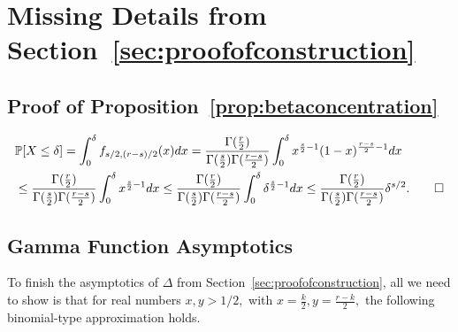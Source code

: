 \documentclass[preprint]{article}
\newcommand{\prob}{\mathbb{P}}
\newcommand{\expect}{\mathbb{E}}
\begin{document}



\section{Missing Details from \texorpdfstring{Section~\ref{sec:proofofconstruction}}{Proof of Construction}}
\label{appendix:MissingDetalsProofOfConstruction}
\subsection{Proof of Proposition~\texorpdfstring{\ref{prop:betaconcentration}}{Beta Concentration}}
   \begin{align*}
       & \prob[X\le \delta] = \int_0^\delta f_{s/2, (r-s)/2}(x)dx = 
   \frac{\Gamma(\frac{r}{2})}{\Gamma(\frac{s}{2})\Gamma(\frac{r-s}{2})}\int_0^\delta x^{\frac{s}{2}-1}(1-x)^{\frac{r-s}{2}-1} dx\\
   &\le 
   \frac{\Gamma(\frac{r}{2})}{\Gamma(\frac{s}{2})\Gamma(\frac{r-s}{2})}\int_0^\delta x^{\frac{s}{2}-1}dx\le 
   \frac{\Gamma(\frac{r}{2})}{\Gamma(\frac{s}{2})\Gamma(\frac{r-s}{2})}\int_0^\delta \delta^{\frac{s}{2}-1}dx\le 
   \frac{\Gamma(\frac{r}{2})}{\Gamma(\frac{s}{2})\Gamma(\frac{r-s}{2})}
   \delta^{s/2}.\qedhere
   \end{align*}
\subsection{Gamma Function Asymptotics}
To finish the asymptotics of $\Delta$ from Section~\ref{sec:proofofconstruction}, all we need to show is that for real numbers $x,y>1/2,$ with $
x=\frac{k}{2}, y=\frac{r-k}{2},$ the following binomial-type approximation holds. 
\end{document}
